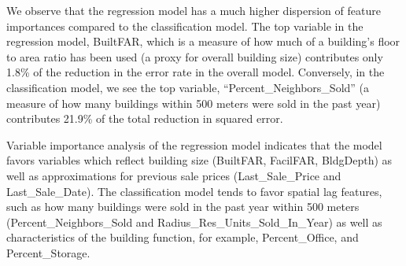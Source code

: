 \documentclass[12pt,]{article}
\begin{document}
\begin{table}

\caption{\label{tab:Class VarImp}\label{tab:ClassVarImp} Feature Importance of Top Performing Classification Model}
\centering
{}
\end{table}

We observe that the regression model has a much higher dispersion of
feature importances compared to the classification model. The top
variable in the regression model, BuiltFAR, which is a measure of how
much of a building's floor to area ratio has been used (a proxy for
overall building size) contributes only 1.8\% of the reduction in the
error rate in the overall model. Conversely, in the classification
model, we see the top variable, ``Percent\_Neighbors\_Sold'' (a measure
of how many buildings within 500 meters were sold in the past year)
contributes 21.9\% of the total reduction in squared error.

Variable importance analysis of the regression model indicates that the
model favors variables which reflect building size (BuiltFAR, FacilFAR,
BldgDepth) as well as approximations for previous sale prices
(Last\_Sale\_Price and Last\_Sale\_Date). The classification model tends
to favor spatial lag features, such as how many buildings were sold in
the past year within 500 meters (Percent\_Neighbors\_Sold and
Radius\_Res\_Units\_Sold\_In\_Year) as well as characteristics of the
building function, for example, Percent\_Office, and Percent\_Storage.
\end{document}
